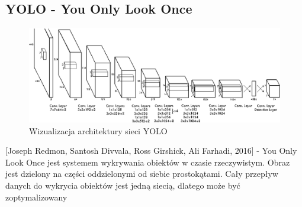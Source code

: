 \documentclass[12pt,a4paper,twoside,titlepage,openright]{book}
\begin{document}
\subsection{YOLO - You Only Look Once}
\begin{figure}[ht]
	\centering
			\includegraphics[resolution=100, scale=0.5]{YOLO.png}
		\caption{Wizualizacja architektury sieci YOLO}
\end{figure}

[Joseph Redmon, Santosh Divvala, Ross Girshick, Ali Farhadi, 2016] - You Only Look Once jest systemem wykrywania obiektów w czasie rzeczywistym. Obraz jest dzielony na części oddzielonymi od siebie prostokątami.
Cały przepływ danych do wykrycia obiektów jest jedną siecią, dlatego może być zoptymalizowany \cite{DBLP:journals/corr/RedmonDGF15}
\end{document}
